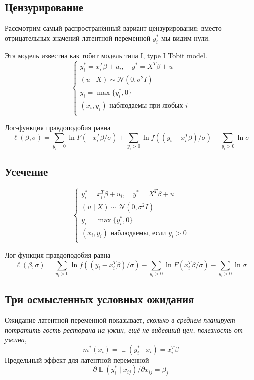 \documentclass[12pt]{article}
\DeclareMathOperator{\E}{\mathbb{E}}
\newcommand{\cN}{\mathcal{N}}
\begin{document}
\subsection{Цензурирование}

Рассмотрим самый распространённый вариант цензурирования: вместо отрицательных значений латентной переменной $y_i^*$ мы видим нули.

Эта модель известна как тобит модель типа I, type I Tobit model. 
\[
\begin{cases}
    y_i^* = x_i^T \beta + u_i, \quad y^* = X^T \beta + u \\
    (u \mid X) \sim \cN(0, \sigma^2 I) \\
    y_i = \max\{y_i^*, 0\} \\
    (x_i, y_i) \text{ наблюдаемы при любых }i \\
\end{cases}
\]

Лог-функция правдоподобия равна
\[
\ell(\beta, \sigma) = \sum_{y_i = 0} {\ln F(-x_i^T \beta / \sigma)} + \sum_{y_i > 0} {\ln f((y_i-x_i^T\beta) / \sigma)} - \sum_{y_i > 0} \ln \sigma
\]


\subsection{Усечение}

\[
\begin{cases}
    y_i^* = x_i^T \beta + u_i, \quad y^* = X^T \beta + u \\
    (u \mid X) \sim \cN(0, \sigma^2 I) \\
    y_i = \max\{y_i^*, 0\} \\
    (x_i, y_i) \text{ наблюдаемы, если } y_i > 0 \\
\end{cases}
\]

Лог-функция правдоподобия равна
\[
\ell(\beta, \sigma) = \sum_{y_i > 0} {\ln f((y_i-x_i^T\beta) / \sigma)} - \sum_{y_i > 0}{\ln F(x_i^T \beta / \sigma)} - \sum_{y_i > 0} \ln \sigma
\]


\subsection{Три осмысленных условных ожидания}

Ожидание латентной переменной показывает, \emph{сколько в среднем планирует потратить гость ресторана на ужин, ещё не видевший цен, полезность от ужина},
\[
m^*(x_i) = \E(y^*_i \mid  x_i) = x_i^T \beta
\]
Предельный эффект для латентной переменной 
\[
\partial \E(y^*_i \mid  x_{ij})/ \partial x_{ij} = \beta_j
\]
\end{document}
